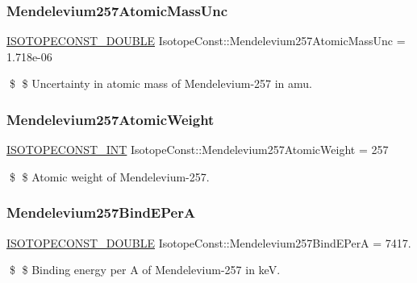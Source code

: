 \subsubsection{\texorpdfstring{Mendelevium257\+Atomic\+Mass\+Unc}{Mendelevium257AtomicMassUnc}}
{\footnotesize\ttfamily \mbox{\hyperlink{group___isotope_const-_macros_ga8f45a7272ce02c0b4c65c44636ed719a}{I\+S\+O\+T\+O\+P\+E\+C\+O\+N\+S\+T\+\_\+\+D\+O\+U\+B\+LE}} Isotope\+Const\+::\+Mendelevium257\+Atomic\+Mass\+Unc = 1.\+718e-\/06}

\$ \$ Uncertainty in atomic mass of Mendelevium-\/257 in amu. \mbox{\label{group___isotope_const-_mendelevium-_md257_gae2b09859f06ac982d1b0159d067fc026}} 
\subsubsection{\texorpdfstring{Mendelevium257\+Atomic\+Weight}{Mendelevium257AtomicWeight}}
{\footnotesize\ttfamily \mbox{\hyperlink{group___isotope_const-_macros_ga5f18360b3e99483a35c32d789e62621c}{I\+S\+O\+T\+O\+P\+E\+C\+O\+N\+S\+T\+\_\+\+I\+NT}} Isotope\+Const\+::\+Mendelevium257\+Atomic\+Weight = 257}

\$ \$ Atomic weight of Mendelevium-\/257. \mbox{\label{group___isotope_const-_mendelevium-_md257_ga4ff8f444885f8676b83377238b4423c5}} 
\subsubsection{\texorpdfstring{Mendelevium257\+Bind\+E\+PerA}{Mendelevium257BindEPerA}}
{\footnotesize\ttfamily \mbox{\hyperlink{group___isotope_const-_macros_ga8f45a7272ce02c0b4c65c44636ed719a}{I\+S\+O\+T\+O\+P\+E\+C\+O\+N\+S\+T\+\_\+\+D\+O\+U\+B\+LE}} Isotope\+Const\+::\+Mendelevium257\+Bind\+E\+PerA = 7417.}

\$ \$ Binding energy per A of Mendelevium-\/257 in keV. \mbox{\label{group___isotope_const-_mendelevium-_md257_gac16e04ea83f062db58135950ad0305e4}} 
